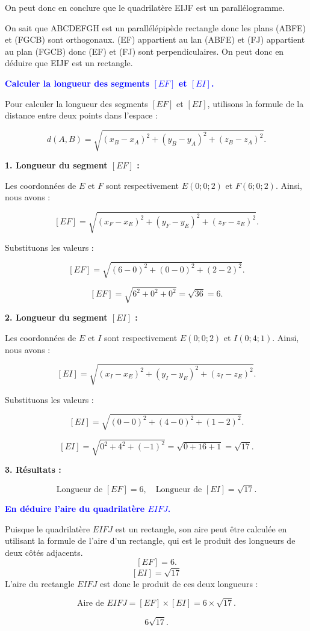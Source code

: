 \documentclass{exam}
\begin{document}
\begin{questions}
    On peut donc en conclure que le quadrilatère EIJF est un parallélogramme. 

    On sait que ABCDEFGH est un parallélépipède rectangle donc les plans (ABFE) et (FGCB) sont orthogonaux. (EF) appartient au lan (ABFE) et (FJ) appartient au plan (FGCB) donc (EF) et (FJ) sont perpendiculaires. 
    On peut donc en déduire que EIJF est un rectangle.

    \question[1] \textbf{\textcolor{blue}{Calculer la longueur des segments $[EF]$ et $[EI]$.}}

    Pour calculer la longueur des segments $[EF]$ et $[EI]$, utilisons la formule de la distance entre deux points dans l'espace :

\[
d(A, B) = \sqrt{(x_B - x_A)^2 + (y_B - y_A)^2 + (z_B - z_A)^2}.
\]

\textbf{1. Longueur du segment $[EF]$ :}

Les coordonnées de $E$ et $F$ sont respectivement $E(0 ; 0 ; 2)$ et $F(6 ; 0 ; 2)$. Ainsi, nous avons :

\[
[EF] = \sqrt{(x_F - x_E)^2 + (y_F - y_E)^2 + (z_F - z_E)^2}.
\]

Substituons les valeurs :

\[
[EF] = \sqrt{(6 - 0)^2 + (0 - 0)^2 + (2 - 2)^2}.
\]

\[
[EF] = \sqrt{6^2 + 0^2 + 0^2} = \sqrt{36} = 6.
\]

\textbf{2. Longueur du segment $[EI]$ :}

Les coordonnées de $E$ et $I$ sont respectivement $E(0 ; 0 ; 2)$ et $I(0 ; 4 ; 1)$. Ainsi, nous avons :

\[
[EI] = \sqrt{(x_I - x_E)^2 + (y_I - y_E)^2 + (z_I - z_E)^2}.
\]

Substituons les valeurs :

\[
[EI] = \sqrt{(0 - 0)^2 + (4 - 0)^2 + (1 - 2)^2}.
\]

\[
[EI] = \sqrt{0^2 + 4^2 + (-1)^2} = \sqrt{0 + 16 + 1} = \sqrt{17}.
\]

\textbf{3. Résultats :}

\[
\text{Longueur de } [EF] = 6, \quad \text{Longueur de } [EI] = \sqrt{17}.
\]

    \question[0.5] \textbf{\textcolor{blue}{En déduire l'aire du quadrilatère $EIFJ$.}}

    Puisque le quadrilatère $EIFJ$ est un rectangle, son aire peut être calculée en utilisant la formule de l'aire d'un rectangle, qui est le produit des longueurs de deux côtés adjacents.
    \[
[EF] = 6.
\]
\[
[EI] = \sqrt{17}
\]
L'aire du rectangle $EIFJ$ est donc le produit de ces deux longueurs :

\[
\text{Aire de } EIFJ = [EF] \times [EI] = 6 \times \sqrt{17}.
\]

\[
\boxed{6\sqrt{17}}.
\]

\end{questions}
\end{document}
